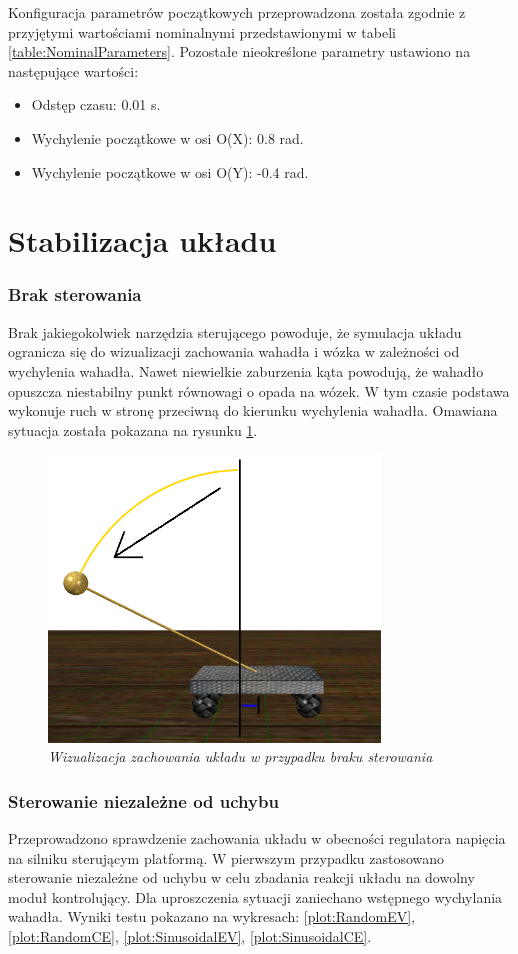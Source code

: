 \documentclass[12pt, oneside]{report}
\theoremstyle{definition}
\begin{document}
Konfiguracja parametrów początkowych przeprowadzona została zgodnie z przyjętymi wartościami nominalnymi przedstawionymi w tabeli \ref{table:NominalParameters}. Pozostałe nieokreślone parametry ustawiono na następujące wartości:
\begin{itemize}
\item Odstęp czasu: 0.01 s.
\item Wychylenie początkowe w osi O(X): 0.8 rad.
\item Wychylenie początkowe w osi O(Y): -0.4 rad.
\end{itemize}

\section{Stabilizacja układu}
\subsubsection{Brak sterowania}
Brak jakiegokolwiek narzędzia sterującego powoduje, że symulacja układu ogranicza się do wizualizacji zachowania wahadła i wózka w zależności od wychylenia wahadła. Nawet niewielkie zaburzenia kąta powodują, że wahadło opuszcza niestabilny punkt równowagi o opada na wózek. W tym czasie podstawa wykonuje ruch w stronę przeciwną do kierunku wychylenia wahadła. Omawiana sytuacja została pokazana na rysunku \ref{figure:ModelWithoutControl}.

\begin{figure}[H]
	\centering
		\includegraphics[width = 250pt]{ModelWithoutControl} 
		\caption{\textit{Wizualizacja zachowania układu w przypadku braku sterowania}}
		\label{figure:ModelWithoutControl}
\end{figure}

\subsubsection{Sterowanie niezależne od uchybu}
Przeprowadzono sprawdzenie zachowania układu w obecności regulatora napięcia na silniku sterującym platformą. W pierwszym przypadku zastosowano sterowanie niezależne od uchybu w celu zbadania reakcji układu na dowolny moduł kontrolujący. Dla uproszczenia sytuacji zaniechano wstępnego wychylania wahadła. Wyniki testu pokazano na wykresach: \ref{plot:RandomEV}, \ref{plot:RandomCE}, \ref{plot:SinusoidalEV}, \ref{plot:SinusoidalCE}.
\end{document}
